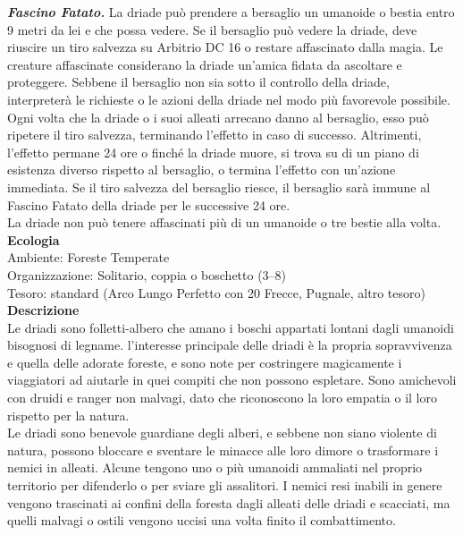 \begin{multicols}{2}
\emph{\textbf{Fascino Fatato.}} La driade può prendere a bersaglio un umanoide o bestia entro 9 metri da lei e che possa vedere. Se il bersaglio può vedere la driade, deve riuscire un tiro salvezza su Arbitrio DC  16 o restare affascinato dalla magia. Le creature affascinate considerano la driade un'amica fidata da ascoltare e proteggere. Sebbene il bersaglio non sia sotto il controllo della driade, interpreterà le richieste o le azioni della driade nel modo più favorevole possibile.\\
Ogni volta che la driade o i suoi alleati arrecano danno al bersaglio, esso può ripetere il tiro salvezza, terminando l'effetto in caso di successo. Altrimenti, l'effetto permane 24 ore o finché la driade muore, si trova su di un piano di esistenza diverso rispetto al bersaglio, o termina l'effetto con un'azione immediata. Se il tiro salvezza del bersaglio riesce, il bersaglio sarà immune al Fascino Fatato della driade per le successive 24 ore.\\
La driade non può tenere affascinati più di un umanoide o tre bestie alla volta.\\
\textbf{Ecologia}\\
Ambiente: Foreste Temperate\\
Organizzazione: Solitario, coppia o boschetto (3–8)\\
Tesoro: standard (Arco Lungo Perfetto con 20 Frecce, Pugnale, altro tesoro)\\
\textbf{Descrizione}\\
Le driadi sono folletti-albero che amano i boschi appartati lontani dagli umanoidi bisognosi di legname. l'interesse principale delle driadi è la propria sopravvivenza e quella delle adorate foreste, e sono note per costringere magicamente i viaggiatori ad aiutarle in quei compiti che non possono espletare. Sono amichevoli con druidi e ranger non malvagi, dato che riconoscono la loro empatia o il loro rispetto per la natura.\\
Le driadi sono benevole guardiane degli alberi, e sebbene non siano violente di natura, possono bloccare e sventare le minacce alle loro dimore o trasformare i nemici in alleati. Alcune tengono uno o più umanoidi ammaliati nel proprio territorio per difenderlo o per sviare gli assalitori. I nemici resi inabili in genere vengono trascinati ai confini della foresta dagli alleati delle driadi e scacciati, ma quelli malvagi o ostili vengono uccisi una volta finito il combattimento.\\


\end{multicols}

